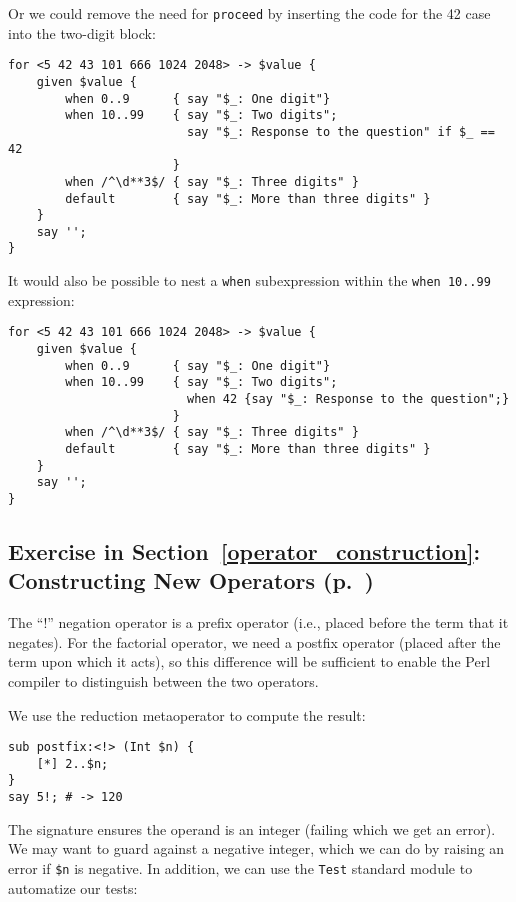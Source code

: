 Or we could remove the need for {\tt proceed} by inserting 
the code for the 42 case into the two-digit block: 

\begin{verbatim}
for <5 42 43 101 666 1024 2048> -> $value {
    given $value {
        when 0..9      { say "$_: One digit"}
        when 10..99    { say "$_: Two digits"; 
                         say "$_: Response to the question" if $_ == 42
                       }
        when /^\d**3$/ { say "$_: Three digits" }
        default        { say "$_: More than three digits" }
    }
    say '';
}
\end{verbatim}

It would also be possible to nest a \verb'when' subexpression 
within the \verb'when 10..99' expression:

\begin{verbatim}
for <5 42 43 101 666 1024 2048> -> $value {
    given $value {
        when 0..9      { say "$_: One digit"}
        when 10..99    { say "$_: Two digits"; 
                         when 42 {say "$_: Response to the question";}
                       }
        when /^\d**3$/ { say "$_: Three digits" }
        default        { say "$_: More than three digits" }
    }
    say '';
}
\end{verbatim}

\subsection{Exercise in Section~\ref{operator_construction}: Constructing New Operators (p.~\pageref{fact_operator})}
\label{sol_fact_operator}

The ``!'' negation operator is a prefix operator (i.e., placed 
before the term that it negates). For the factorial operator, 
we need a postfix operator (placed after the term upon which it 
acts), so this difference will be sufficient to enable the 
Perl compiler to distinguish between the two operators.

We use the reduction metaoperator to compute the result:

\begin{verbatim}
sub postfix:<!> (Int $n) {
    [*] 2..$n;
}
say 5!; # -> 120
\end{verbatim}


The signature ensures the operand is an integer (failing which 
we get an error). We may want to guard against a 
negative integer, which we can do by raising an error if 
\verb'$n' is negative. In addition, we can use the {\tt Test} 
standard module to automatize our tests:

